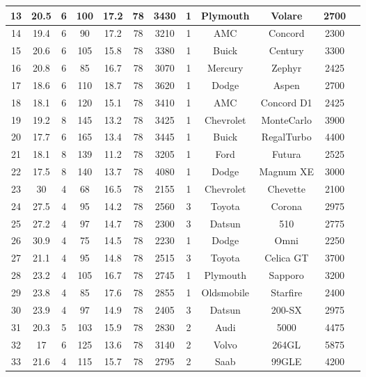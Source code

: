 \documentclass[12pt]{report}\usepackage[]{graphicx}\usepackage[]{color}
\begin{document}
\begin{table}[ht!]
\begin{tabular}{c|c|c|c|c|c|c|c|c|c|c|c}
 \hline
13 & 20.5& 6& 100& 17.2& 78& 3430& 1& Plymouth  & Volare    & 2700&         \\
 \hline
14 & 19.4& 6& 90& 17.2& 78& 3210& 1& AMC       & Concord   & 2300&         \\
 \hline
15 & 20.6& 6& 105& 15.8& 78& 3380& 1& Buick     & Century   & 3300&         \\
 \hline
16 & 20.8& 6& 85& 16.7& 78& 3070& 1& Mercury   & Zephyr    & 2425&         \\
 \hline
17 & 18.6& 6& 110& 18.7& 78& 3620& 1& Dodge     & Aspen     & 2700&         \\
 \hline
18 & 18.1& 6& 120& 15.1& 78& 3410& 1& AMC       & Concord D1& 2425&         \\
 \hline
19 & 19.2& 8& 145& 13.2& 78& 3425& 1& Chevrolet & MonteCarlo& 3900&         \\
 \hline
20 & 17.7& 6& 165& 13.4& 78& 3445& 1& Buick     & RegalTurbo& 4400&         \\
 \hline
21 & 18.1& 8& 139& 11.2& 78& 3205& 1& Ford      & Futura    & 2525&         \\
 \hline
22 & 17.5& 8& 140& 13.7& 78& 4080& 1& Dodge     & Magnum XE & 3000&         \\
 \hline
23 & 30& 4& 68& 16.5& 78& 2155& 1& Chevrolet & Chevette  & 2100&         \\
 \hline
24 & 27.5& 4& 95& 14.2& 78& 2560& 3& Toyota    & Corona    & 2975&         \\
 \hline
25 & 27.2& 4& 97& 14.7& 78& 2300& 3& Datsun    & 510& 2775&         \\
 \hline
26 & 30.9& 4& 75& 14.5& 78& 2230& 1& Dodge     & Omni      & 2250&         \\
 \hline
27 & 21.1& 4& 95& 14.8& 78& 2515& 3& Toyota    & Celica GT & 3700&         \\
 \hline
28 & 23.2& 4& 105& 16.7& 78& 2745& 1& Plymouth  & Sapporo   & 3200&         \\
 \hline
29 & 23.8& 4& 85& 17.6& 78& 2855& 1& Oldsmobile& Starfire  & 2400&         \\
 \hline
30 & 23.9& 4& 97& 14.9& 78& 2405& 3& Datsun    & 200-SX    & 2975&         \\
 \hline
31 & 20.3& 5& 103& 15.9& 78& 2830& 2& Audi      & 5000& 4475&         \\
 \hline
32 & 17& 6& 125& 13.6& 78& 3140& 2& Volvo     & 264GL     & 5875&         \\
 \hline
33 & 21.6& 4& 115& 15.7& 78& 2795& 2& Saab      & 99GLE     & 4200&         \\

\end{tabular}
\end{table}
\end{document}
